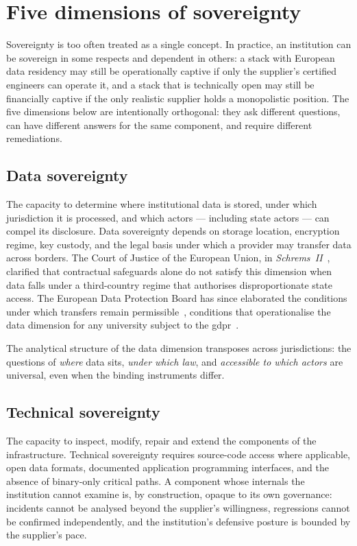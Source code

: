 \section{Five dimensions of sovereignty}
\label{sec:sg-dimensions}

Sovereignty is too often treated as a single concept. In practice, an
institution can be sovereign in some respects and dependent in others:
a stack with European data residency may still be operationally captive
if only the supplier's certified engineers can operate it, and a stack
that is technically open may still be financially captive if the only
realistic supplier holds a monopolistic position. The five dimensions
below are intentionally orthogonal: they ask different questions, can
have different answers for the same component, and require different
remediations.

\subsection{Data sovereignty}
\label{sec:sg-data}

The capacity to determine where institutional data is stored, under
which jurisdiction it is processed, and which actors --- including
state actors --- can compel its disclosure. Data sovereignty depends on
storage location, encryption regime, key custody, and the legal basis
under which a provider may transfer data across borders. The Court of
Justice of the European Union, in \emph{Schrems~II}~\cite{schrems2020},
clarified that contractual safeguards alone do not satisfy this
dimension when data falls under a third-country regime that authorises
disproportionate state access. The European Data Protection Board has
since elaborated the conditions under which transfers remain
permissible~\cite{edpb-guidelines}, conditions that operationalise the
data dimension for any university subject to the
\gls{gdpr}~\cite{gdpr}.

The analytical structure of the data dimension transposes across
jurisdictions: the questions of \emph{where} data sits, \emph{under
which law}, and \emph{accessible to which actors} are universal, even
when the binding instruments differ.

\subsection{Technical sovereignty}
\label{sec:sg-technical}

The capacity to inspect, modify, repair and extend the components of
the infrastructure. Technical sovereignty requires source-code access
where applicable, open data formats, documented application
programming interfaces, and the absence of binary-only critical paths. A component whose internals the
institution cannot examine is, by construction, opaque to its own
governance: incidents cannot be analysed beyond the supplier's
willingness, regressions cannot be confirmed independently, and the
institution's defensive posture is bounded by the supplier's pace.

